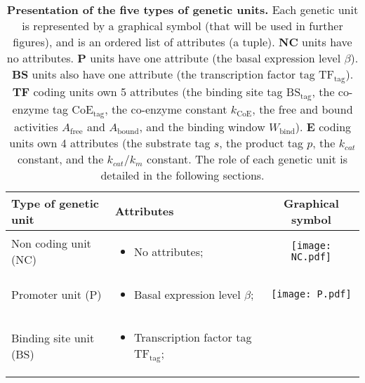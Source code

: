 
\begin{table}[!ht]
\begin{adjustwidth}{0in}{0in}
\centering
\caption[Presentation of the five types of genetic units.]{\textbf{Presentation of the five types of genetic units.} Each genetic unit is represented by a graphical symbol (that will be used in further figures), and is an ordered list of attributes (a tuple). \textbf{NC} units have no attributes. \textbf{P} units have one attribute (the basal expression level $\beta$). \textbf{BS} units also have one attribute (the transcription factor tag $\text{TF}_\text{tag}$). \textbf{TF} coding units own 5 attributes (the binding site tag $\text{BS}_\text{tag}$, the co-enzyme tag $\text{CoE}_\text{tag}$, the co-enzyme constant $k_\text{CoE}$, the free and bound activities $A_\text{free}$ and $A_\text{bound}$, and the binding window $W_\text{bind}$). \textbf{E} coding units own 4 attributes (the substrate tag $s$, the product tag $p$, the $k_{cat}$ constant, and the $k_{cat}/k_m$ constant. The role of each genetic unit is detailed in the following sections.}
\begin{tabular}{ | m{} | m{} | c |}
\hline
\textbf{Type of genetic unit} & \textbf{Attributes} & \textbf{Graphical symbol}\\
\hline
Non coding unit (NC)
& 
\begin{itemize}
\item[] No attributes;
\end{itemize}
&
\begin{minipage}{.1\textwidth}
\centering
\texttt{[image: NC.pdf]}
\end{minipage}
\\
\hline
Promoter unit (P)
& 
\begin{itemize}
\item[] Basal expression level $\beta$;
\end{itemize}
&
\begin{minipage}{.1\textwidth}
\centering
\texttt{[image: P.pdf]}
\end{minipage}
\\
\hline
Binding site unit (BS)
& 
\begin{itemize}
\item[] Transcription factor tag $\text{TF}_\text{tag}$;
\end{itemize}
&
\begin{minipage}{.1\textwidth}

\end{minipage}
\end{tabular}
\end{adjustwidth}
\end{table}
